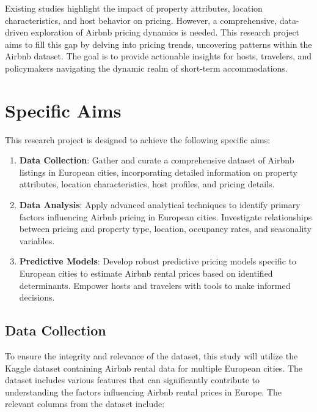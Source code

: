 \documentclass[12pt, letterpaper]{article}
\begin{document}
Existing studies highlight the impact of property attributes, location characteristics, and host behavior on pricing. However, a comprehensive, data-driven exploration of Airbnb pricing dynamics is needed. This research project aims to fill this gap by delving into pricing trends, uncovering patterns within the Airbnb dataset. The goal is to provide actionable insights for hosts, travelers, and policymakers navigating the dynamic realm of short-term accommodations.

\section*{Specific Aims}
This research project is designed to achieve the following specific aims:

\begin{enumerate}
  \item \textbf{Data Collection}: Gather and curate a comprehensive dataset of Airbnb listings in European cities, incorporating detailed information on property attributes, location characteristics, host profiles, and pricing details.
  \item \textbf{Data Analysis}: Apply advanced analytical techniques to identify primary factors influencing Airbnb pricing in European cities. Investigate relationships between pricing and property type, location, occupancy rates, and seasonality variables.
  \item \textbf{Predictive Models}: Develop robust predictive pricing models specific to European cities to estimate Airbnb rental prices based on identified determinants. Empower hosts and travelers with tools to make informed decisions.
\end{enumerate}

\subsection*{Data Collection}
To ensure the integrity and relevance of the dataset, this study will utilize the Kaggle dataset containing Airbnb rental data for multiple European cities. The dataset includes various features that can significantly contribute to understanding the factors influencing Airbnb rental prices in Europe. The relevant columns from the dataset include:
\end{document}
